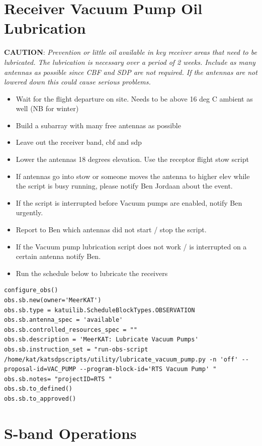 \section{Receiver Vacuum Pump Oil Lubrication}
\textbf{CAUTION}:
\textit{Prevention or little oil available in key receiver areas that need to be lubricated. The lubrication is necessary over a period of 2 weeks. Include as many antennas as possible since CBF and SDP are not required. If the antennas are not  lowered down this could cause serious problems.}
\begin{itemize}


\item  Wait for the flight departure on site. Needs to be above 16 deg C ambient as well (NB for winter)
\item Build a subarray with many free antennas as possible
\item Leave out the receiver band, cbf and sdp
\item Lower the antennas 18 degrees elevation. Use the receptor flight stow script
\item If antennas go into stow or someone moves the antenna to higher elev while the script is busy running, please notify Ben Jordaan about the event.
\item If the script is interrupted before Vacuum pumps are enabled, notify Ben urgently. 
\item Report to Ben which antennas did not start / stop the script.
\item If the Vacuum pump lubrication script does not work / is interrupted on a  certain antenna notify Ben.
\item Run the schedule below to lubricate the receivers
\end{itemize}

\begin{lstlisting}[style=DOS]
configure_obs()
obs.sb.new(owner='MeerKAT')
obs.sb.type = katuilib.ScheduleBlockTypes.OBSERVATION
obs.sb.antenna_spec = 'available'
obs.sb.controlled_resources_spec = ""
obs.sb.description = 'MeerKAT: Lubricate Vacuum Pumps'
obs.sb.instruction_set = "run-obs-script /home/kat/katsdpscripts/utility/lubricate_vacuum_pump.py -n 'off' --proposal-id=VAC_PUMP --program-block-id='RTS Vacuum Pump' "
obs.sb.notes= "projectID=RTS "
obs.sb.to_defined()
obs.sb.to_approved()
\end{lstlisting}


\section{ S-band Operations}

